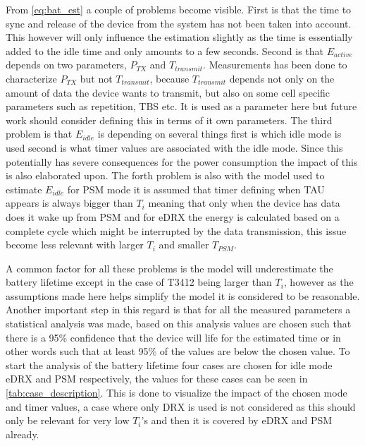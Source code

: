 From \autoref{eq:bat_est} a couple of problems become visible. 
First is that the time to sync and release of the device from the system has not been taken into account. This however will only influence the estimation slightly as the time is essentially added to the idle time and only amounts to a few seconds. 
Second is that $E_{active}$ depends on two parameters, $P_{TX}$ and $T_{transmit}$. Measurements has been done to characterize $P_{TX}$ but not $T_{transmit}$, because $T_{transmit}$ depends not only on the amount of data the device wants to transmit, but also on some cell specific parameters such as repetition, TBS etc. It is used as a parameter here but future work should consider defining this in terms of it own parameters. 
The third problem is that $E_{idle}$ is depending on several things first is which idle mode is used second is what timer values are associated with the idle mode. Since this potentially has severe consequences for the power consumption the impact of this is also elaborated upon. 
The forth problem is also with the model used to estimate $E_{idle}$ for PSM mode it is assumed that timer defining when \gls{TAU} appears is always bigger than $T_i$ meaning that only when the device has data does it wake up from PSM and for eDRX the energy is calculated based on a complete cycle which might be interrupted by the data transmission, this issue become less relevant with larger $T_i$ and smaller $T_{PSM}$. 

A common factor for all these problems is the model will underestimate the battery lifetime except in the case of T3412 being larger than $T_i$, however as the assumptions made here helps simplify the model it is considered to be reasonable. Another important step in this regard is that for all the measured parameters a statistical analysis was made, based on this analysis values are chosen such that there is a 95\% confidence that the device will life for the estimated time or in other words such that at least 95\% of the values are below the chosen value. To start the analysis of the battery lifetime four cases are chosen for idle mode eDRX and PSM respectively, the values for these cases can be seen in \autoref{tab:case_description}. This is done to visualize the impact of the chosen mode and timer values, a case where only DRX is used is not considered as this should only be relevant for very low $T_i$'s and then it is covered by eDRX and PSM already.

